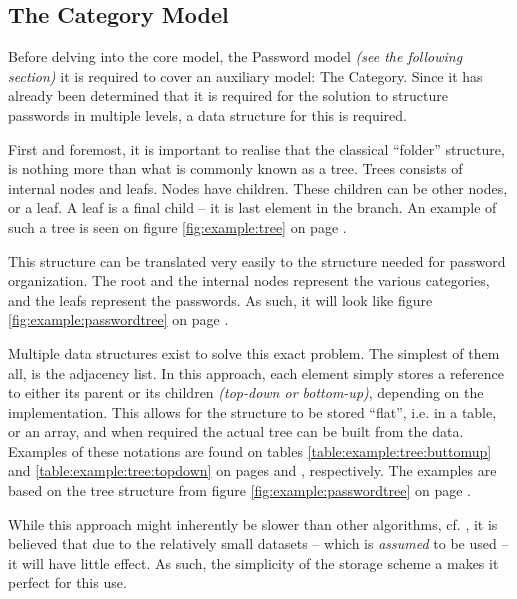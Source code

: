 		\subsection{The Category Model}
			\label{sec:model:category}
			Before delving into the core model, the Password model \emph{(see the following section)} it is required to cover an auxiliary model: The Category. Since it has already been determined that it is required for the solution to structure passwords in multiple levels, a data structure for this is required.

			First and foremost, it is important to realise that the classical ``folder'' structure, is nothing more than what is commonly known as a tree. Trees consists of internal nodes and leafs. Nodes have children. These children can be other nodes, or a leaf. A leaf is a final child -- it is last element in the branch. An example of such a tree is seen on figure \ref{fig:example:tree} on page \pageref{fig:example:tree}.

			This structure can be translated very easily to the structure needed for password organization. The root and the internal nodes represent the various categories, and the leafs represent the passwords. As such, it will look like figure \ref{fig:example:passwordtree} on page \pageref{fig:example:passwordtree}.

			Multiple data structures exist to solve this exact problem. The simplest of them all, is the adjacency list. In this approach, each element simply stores a reference to either its parent or its children \emph{(top-down or bottom-up)}, depending on the implementation. This allows for the structure to be stored ``flat'', i.e. in a table, or an array, and when required the actual tree can be built from the data. Examples of these notations are found on tables \ref{table:example:tree:buttomup} and \ref{table:example:tree:topdown} on pages \pageref{table:example:tree:buttomup} and \pageref{table:example:tree:topdown}, respectively. The examples are based on the tree structure from figure \ref{fig:example:passwordtree} on page \pageref{fig:example:passwordtree}.

			While this approach might inherently be slower than other algorithms, cf. \cite{heirarchial_database}, it is believed that due to the relatively small datasets -- which is \emph{assumed} to be used -- it will have little effect. As such, the simplicity of the storage scheme a makes it perfect for this use.

